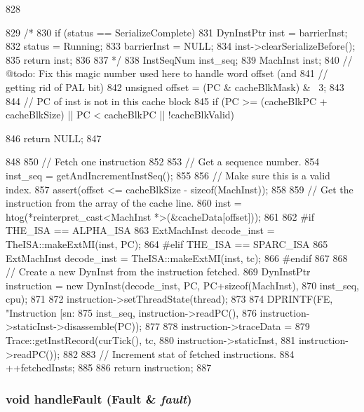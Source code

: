 \begin{DoxyCode}
828 {
829 /*
830     if (status == SerializeComplete) {
831         DynInstPtr inst = barrierInst;
832         status = Running;
833         barrierInst = NULL;
834         inst->clearSerializeBefore();
835         return inst;
836     }
837 */
838     InstSeqNum inst_seq;
839     MachInst inst;
840     // @todo: Fix this magic number used here to handle word offset (and
841     // getting rid of PAL bit)
842     unsigned offset = (PC & cacheBlkMask) & ~3;
843 
844     // PC of inst is not in this cache block
845     if (PC >= (cacheBlkPC + cacheBlkSize) || PC < cacheBlkPC || !cacheBlkValid) {
      
846         return NULL;
847     }
848 
850     // Fetch one instruction
852 
853     // Get a sequence number.
854     inst_seq = getAndIncrementInstSeq();
855 
856     // Make sure this is a valid index.
857     assert(offset <= cacheBlkSize - sizeof(MachInst));
858 
859     // Get the instruction from the array of the cache line.
860     inst = htog(*reinterpret_cast<MachInst *>(&cacheData[offset]));
861 
862 #if THE_ISA == ALPHA_ISA
863     ExtMachInst decode_inst = TheISA::makeExtMI(inst, PC);
864 #elif THE_ISA == SPARC_ISA
865     ExtMachInst decode_inst = TheISA::makeExtMI(inst, tc);
866 #endif
867 
868     // Create a new DynInst from the instruction fetched.
869     DynInstPtr instruction = new DynInst(decode_inst, PC, PC+sizeof(MachInst),
870                                          inst_seq, cpu);
871 
872     instruction->setThreadState(thread);
873 
874     DPRINTF(FE, "Instruction [sn:%
875             inst_seq, instruction->readPC(),
876             instruction->staticInst->disassemble(PC));
877 
878     instruction->traceData =
879         Trace::getInstRecord(curTick(), tc,
880                              instruction->staticInst,
881                              instruction->readPC());
882 
883     // Increment stat of fetched instructions.
884     ++fetchedInsts;
885 
886     return instruction;
887 }
\end{DoxyCode}
\hypertarget{classFrontEnd_a5ad7aa907418d2f604823ae7b0560036}{
\subsubsection[{handleFault}]{\setlength{\rightskip}{0pt plus 5cm}void handleFault ({\bf Fault} \& {\em fault})}}
\label{classFrontEnd_a5ad7aa907418d2f604823ae7b0560036}




